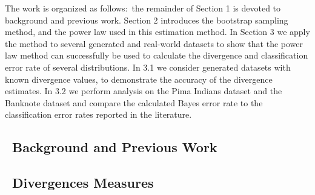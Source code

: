 \documentclass{article}
\begin{document}
 	\indent	The work is organized as follows:\ the remainder of Section 1 is devoted to background and previous work. Section 2 introduces the bootstrap sampling method, and the power law used in this estimation method. In Section 3 we apply the method to several generated and real-world datasets to show that the power law method can successfully be used to calculate the divergence and classification error rate of several distributions. In 3.1 we consider generated datasets with known divergence values, to demonstrate the accuracy of the divergence estimates. In 3.2 we perform analysis on the Pima Indians dataset and the Banknote dataset and compare the calculated Bayes error rate to the classification error rates reported in the literature.
	\subsection*{\ Background and Previous Work}	

	\subsection{\ Divergences Measures}
\end{document}
